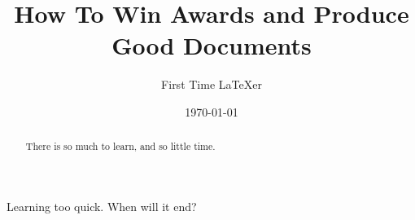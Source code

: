 \documentclass[a4paper,11pt]{article}
\title{How To Win Awards and Produce Good Documents}
\author{First Time LaTeXer}
\date{\today}
\begin{document}
\maketitle
\begin{abstract}
There is so much to learn, and so little time.
\end{abstract}
Learning too quick. When will it end?
\end{document}

